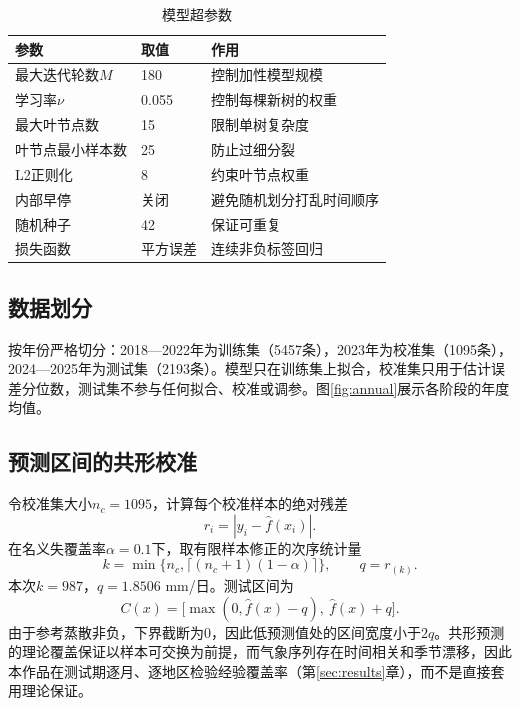 \begin{table}[H]\centering\small
\caption{模型超参数}\label{tab:hyper}
\begin{tabularx}{\linewidth}{@{}l l X@{}}\toprule
参数 & 取值 & 作用\\\midrule
最大迭代轮数$M$ & 180 & 控制加性模型规模\\
学习率$\nu$ & 0.055 & 控制每棵新树的权重\\
最大叶节点数 & 15 & 限制单树复杂度\\
叶节点最小样本数 & 25 & 防止过细分裂\\
L2正则化 & 8 & 约束叶节点权重\\
内部早停 & 关闭 & 避免随机划分打乱时间顺序\\
随机种子 & 42 & 保证可重复\\
损失函数 & 平方误差 & 连续非负标签回归\\\bottomrule
\end{tabularx}
\end{table}

\subsection{数据划分}
按年份严格切分：2018—2022年为训练集（5457条），2023年为校准集（1095条），2024—2025年为测试集（2193条）。模型只在训练集上拟合，校准集只用于估计误差分位数，测试集不参与任何拟合、校准或调参。图\ref{fig:annual}展示各阶段的年度均值。


\subsection{预测区间的共形校准}
令校准集大小$n_c=1095$，计算每个校准样本的绝对残差
\begin{equation}
r_i=|y_i-\widehat f(x_i)|.
\end{equation}
在名义失覆盖率$\alpha=0.1$下，取有限样本修正的次序统计量\cite{vovk,lei,conformal}
\begin{equation}\label{eq:quantile}
k=\min\{n_c,\lceil(n_c+1)(1-\alpha)\rceil\},\qquad q=r_{(k)}.
\end{equation}
本次$k=987$，$q=1.8506$ mm/日。测试区间为
\begin{equation}\label{eq:interval}
C(x)=\bigl[\max(0,\widehat f(x)-q),\ \widehat f(x)+q\bigr].
\end{equation}
由于参考蒸散非负，下界截断为0，因此低预测值处的区间宽度小于$2q$。共形预测的理论覆盖保证以样本可交换为前提，而气象序列存在时间相关和季节漂移，因此本作品在测试期逐月、逐地区检验经验覆盖率（第\ref{sec:results}章），而不是直接套用理论保证。

